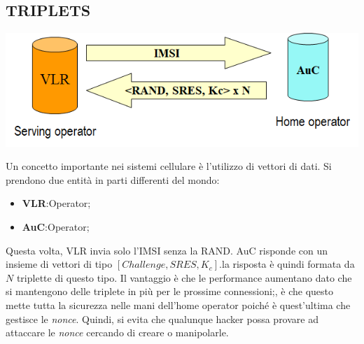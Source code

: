 \documentclass{book}
\theoremstyle{remark}
\begin{document}
\subsection{TRIPLETS}
\begin{center}
	\includegraphics[scale=0.4]{triplets.png}
\end{center}
Un concetto importante nei sistemi cellulare è l'utilizzo di vettori di dati\@. Si prendono due entità in parti differenti del mondo:\begin{itemize}
	\item \textbf{VLR}:\@Serving Operator;\@
	\item \textbf{AuC}:\@Home Operator;\@
\end{itemize}
Questa volta, VLR invia solo l'IMSI senza la RAND\@. AuC risponde con un insieme di vettori di tipo \([Challenge,SRES,K_c]\)\@.\newline la risposta è quindi formata da \(N\) triplette di questo tipo\@. Il vantaggio è che le performance aumentano dato che si mantengono delle triplete in più per le prossime connessioni;\@inoltre, è che questo mette tutta la sicurezza nelle mani dell'home operator poiché è quest'ultima che gestisce le \emph{nonce}\@. Quindi, si evita che qualunque hacker possa provare ad attaccare le \emph{nonce} cercando di creare o manipolarle\@.
\end{document}
